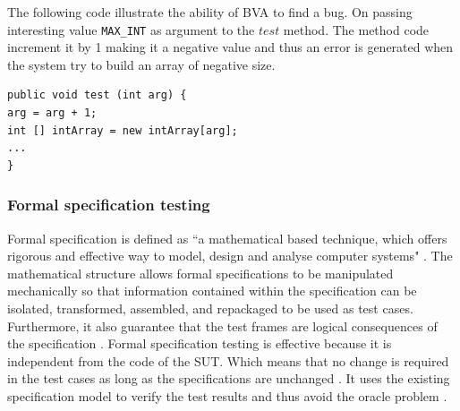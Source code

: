  The following code illustrate the ability of BVA to find a bug.  On passing interesting value \verb+MAX_INT+ as argument to the $test$ method. The method code increment it by 1 making it a negative value and thus an error is generated when the system try to build an array of negative size.

\begin{lstlisting}
public void test (int arg) {
arg = arg + 1;
int [] intArray = new intArray[arg];
...
}
\end{lstlisting}



\subsubsection{Formal specification testing}
Formal specification is defined as ``a mathematical based technique, which offers rigorous and effective way to model, design and analyse computer systems" \cite{formal1997specification, Hierons2009}. The mathematical structure allows formal specifications to be manipulated mechanically so that information contained within the specification can be isolated, transformed, assembled, and repackaged to be used as test cases. Furthermore, it also guarantee that the test frames are logical consequences of the specification \cite{donat1997automating}. Formal specification testing is effective because it is independent from the code of the SUT. Which means that no change is required in the test cases as long as the specifications are unchanged \cite{gaudel2010software}. It uses the existing specification model to verify the test results and thus avoid the oracle problem \cite{bertolino2007software}.







